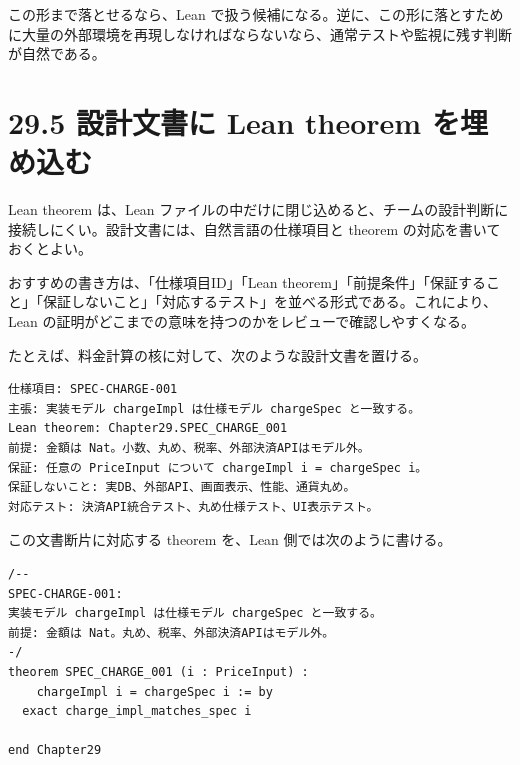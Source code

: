 この形まで落とせるなら、Lean で扱う候補になる。逆に、この形に落とすために大量の外部環境を再現しなければならないなら、通常テストや監視に残す判断が自然である。

\section{29.5 設計文書に Lean theorem を埋め込む}

Lean theorem は、Lean ファイルの中だけに閉じ込めると、チームの設計判断に接続しにくい。設計文書には、自然言語の仕様項目と theorem の対応を書いておくとよい。

\begin{softwarebox}
おすすめの書き方は、「仕様項目ID」「Lean theorem」「前提条件」「保証すること」「保証しないこと」「対応するテスト」を並べる形式である。これにより、Lean の証明がどこまでの意味を持つのかをレビューで確認しやすくなる。
\end{softwarebox}

たとえば、料金計算の核に対して、次のような設計文書を置ける。

\begin{listing}[htbp]
\begin{verbatim}
仕様項目: SPEC-CHARGE-001
主張: 実装モデル chargeImpl は仕様モデル chargeSpec と一致する。
Lean theorem: Chapter29.SPEC_CHARGE_001
前提: 金額は Nat。小数、丸め、税率、外部決済APIはモデル外。
保証: 任意の PriceInput について chargeImpl i = chargeSpec i。
保証しないこと: 実DB、外部API、画面表示、性能、通貨丸め。
対応テスト: 決済API統合テスト、丸め仕様テスト、UI表示テスト。
\end{verbatim}
\caption{設計文書中の theorem 対応表の例}
\label{lst:ch29-design-doc-fragment}
\end{listing}

この文書断片に対応する theorem を、Lean 側では次のように書ける。

\begin{listing}[htbp]
\begin{verbatim}
/--
SPEC-CHARGE-001:
実装モデル chargeImpl は仕様モデル chargeSpec と一致する。
前提: 金額は Nat。丸め、税率、外部決済APIはモデル外。
-/
theorem SPEC_CHARGE_001 (i : PriceInput) :
    chargeImpl i = chargeSpec i := by
  exact charge_impl_matches_spec i

end Chapter29
\end{verbatim}
\caption{設計文書IDに対応する theorem}
\label{lst:ch29-spec-charge-001}
\end{listing}

